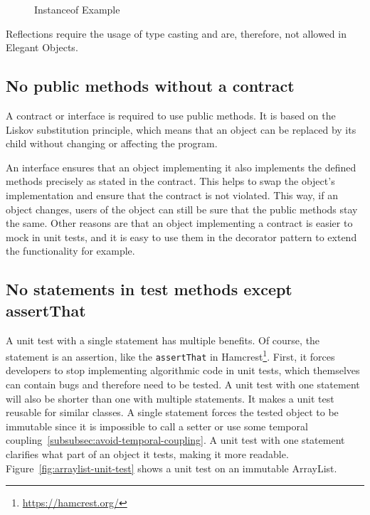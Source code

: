 \begin{figure}[h]
    \caption{Instanceof Example}
    
    \label{fig:instanceof-example}
\end{figure}

Reflections require the usage of type casting and are, therefore, not allowed in Elegant Objects.\cite{elegant-objects}

\subsection{No public methods without a contract}\label{subsec:no-public-methods-without-a-contract}
A contract or interface is required to use public methods.
It is based on the Liskov substitution principle, which means that an object can be replaced by its child without changing or affecting the program.

An interface ensures that an object implementing it also implements the defined methods precisely as stated in the contract.
This helps to swap the object's implementation and ensure that the contract is not violated.
This way, if an object changes, users of the object can still be sure that the public methods stay the same.
Other reasons are that an object implementing a contract is easier to mock in unit tests, and it is easy to use them in the decorator pattern to extend the functionality for example.\cite{elegant-objects}


\subsection{No statements in test methods except assertThat}\label{subsec:no-statements-in-test-methods-except-assertthat}
A unit test with a single statement has multiple benefits.
Of course, the statement is an assertion, like the \texttt{assertThat} in Hamcrest\footnote{\url{https://hamcrest.org/}}.
First, it forces developers to stop implementing algorithmic code in unit tests, which themselves can contain bugs and therefore need to be tested.
A unit test with one statement will also be shorter than one with multiple statements.
It makes a unit test reusable for similar classes.
A single statement forces the tested object to be immutable since it is impossible to call a setter or use some temporal coupling\ \ref{subsubsec:avoid-temporal-coupling}.
A unit test with one statement clarifies what part of an object it tests, making it more readable.
Figure\ \ref{fig:arraylist-unit-test} shows a unit test on an immutable ArrayList.\cite{elegant-objects}

